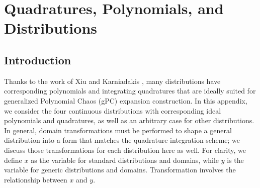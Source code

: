 
\chapter{Quadratures, Polynomials, and Distributions} %

\label{apx:quads dists} %





\section{Introduction}
Thanks to the work of Xiu and Karniadakis \cite{xiu}, many distributions have corresponding polynomials and
integrating quadratures that are ideally suited for generalized Polynomial Chaos (gPC) expansion construction.
In this appendix, we consider the four continuous distributions with corresponding ideal polynomials and
quadratures, as well as an arbitrary case for other distributions.  In general, domain transformations must be
performed to shape a general distribution into a form that matches the quadrature integration scheme; we
discuss those transformations for each distribution here as well.  For clarity, we define $x$ as the
variable for standard distributions and domains, while $y$ is the variable for generic distributions and
domains.  Transformation involves the relationship between $x$ and $y$.


